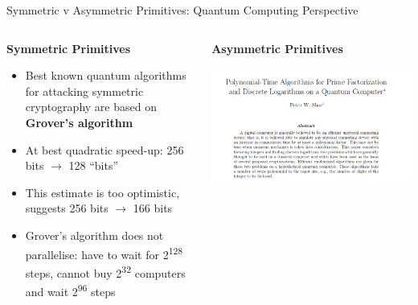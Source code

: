 \documentclass[xcolor=table,10pt,aspectratio=169]{beamer}
\begin{document}
\begin{frame}[label={sec:orged723bc}]{Symmetric v Asymmetric Primitives: Quantum Computing Perspective}
\begin{columns}[t]
\begin{column}{0.5\columnwidth}
\textbf{Symmetric Primitives}

\phantom{M}

\begin{itemize}
\item Best known quantum algorithms for attacking symmetric cryptography are based on \textbf{Grover’s algorithm}
\item At best quadratic speed-up: 256 bits \(\rightarrow\) 128 “bits”
\item This estimate is too optimistic,  \cite{SAC:AMGMPS16} suggests 256 bits \(\rightarrow\) 166 bits
\item Grover’s algorithm does not parallelise: have to wait for 2\textsuperscript{128} steps, cannot buy 2\textsuperscript{32} computers and wait 2\textsuperscript{96} steps
\end{itemize}
\end{column}


\begin{column}{0.5\columnwidth}
\textbf{Asymmetric Primitives}

\phantom{M}

\begin{center}
\includegraphics[width=.9\linewidth]{./shor.png}
\end{center}
\end{column}
\end{columns}
\end{frame}
\end{document}
